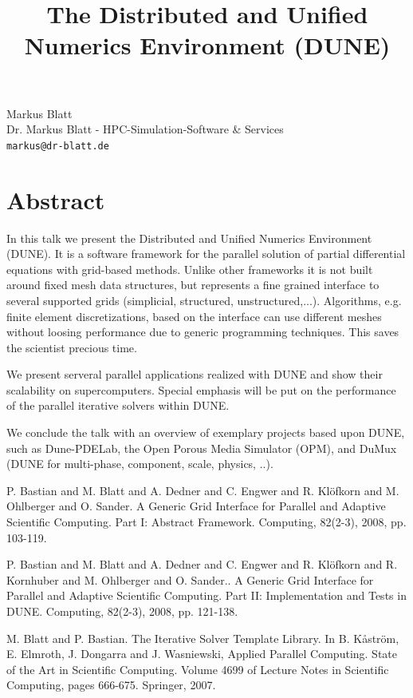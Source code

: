 \documentclass[article,A4,11pt]{llncs}%
\begin{document}
\title{The Distributed and Unified Numerics Environment (DUNE)}
 \author{} \institute{}
\maketitle
\begin{center}
{\large Markus Blatt}\\
Dr. Markus Blatt - HPC-Simulation-Software \& Services\\
{\tt markus@dr-blatt.de}
\end{center}

\section*{Abstract}
In this talk we present the Distributed and Unified Numerics Environment (DUNE). It is a software framework for the parallel solution of partial differential equations with grid-based methods. Unlike other frameworks it is not built 
around fixed mesh data structures, but represents a fine grained interface to several supported grids (simplicial, structured, unstructured,...). Algorithms, e.g. finite element discretizations, 
based on the interface can use different meshes without loosing performance due to generic programming techniques. This saves the scientist precious time.  

We present serveral parallel applications realized with DUNE and show their scalability on supercomputers. Special emphasis will be put on the performance of the parallel iterative solvers within DUNE. 

We conclude the talk with an overview of exemplary projects based upon DUNE, such as Dune-PDELab, the Open Porous Media Simulator  (OPM), and DuMux (DUNE for multi-phase, component, scale, physics, ..).


\begin{thebibliography}{10}
{\sc P. Bastian and M. Blatt and A. Dedner and C. Engwer and R. Klöfkorn and M. Ohlberger and O. Sander}. {A Generic Grid Interface for Parallel and Adaptive Scientific Computing. Part I: Abstract Framework}. Computing, 82(2-3), 2008, pp. 103-119.

{\sc P. Bastian and M. Blatt and A. Dedner and C. Engwer and R. Klöfkorn and R. Kornhuber and M. Ohlberger and O. Sander.}. {A Generic Grid Interface for Parallel and Adaptive Scientific Computing. Part II: Implementation and Tests in DUNE}. Computing, 82(2-3), 2008, pp. 121-138.

{\sc M. Blatt and P. Bastian}. {The Iterative Solver Template Library}. In B. Kåström, E. Elmroth, J. Dongarra and J. Wasniewski, Applied Parallel Computing. State of the Art in Scientific Computing. Volume 4699 of Lecture Notes in Scientific Computing, pages 666-675. Springer, 2007.
\end{thebibliography}
\end{document}
